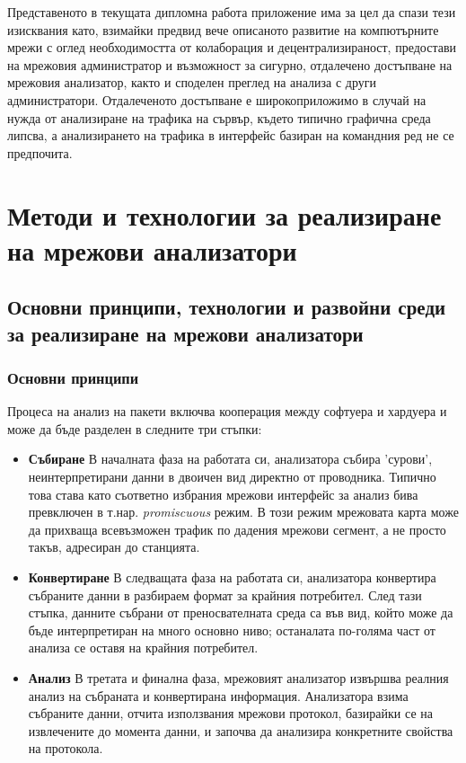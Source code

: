 \documentclass[12pt,a4paper,oneside]{book}
\begin{document}
Представеното в текущата дипломна работа приложение има за цел да спази тези
изисквания като, взимайки предвид вече описаното развитие на компютърните мрежи
с оглед необходимостта от колаборация и децентрализираност, предостави на
мрежовия администратор и възможност за сигурно, отдалечено достъпване на мрежовия
анализатор, както и споделен преглед на анализа с други администратори.
Отдалеченото достъпване е широкоприложимо в случай на нужда от анализиране на
трафика на сървър, където типично графична среда липсва, а анализирането на
трафика в интерфейс базиран на командния ред не се предпочита.

\justify
\chapter{Методи и технологии за реализиране на мрежови анализатори}

\section{Основни принципи, технологии и развойни среди за реализиране на мрежови
анализатори}

\subsection{Основни принципи}
Процеса на анализ на пакети включва кооперация между софтуера и хардуера и може
да бъде разделен в следните три стъпки:

\begin{itemize}
  \item
    \textbf{Събиране} В началната фаза на работата си, анализатора събира
    'сурови', неинтерпретирани данни в двоичен вид директно от проводника.
    Типично това става като съответно избрания мрежови интерфейс за анализ
    бива превключен в т.нар.  \textit{promiscuous} режим. В този режим мрежовата
    карта може да прихваща всевъзможен трафик по дадения мрежови сегмент, а не
    просто такъв, адресиран до станцията.
  \item
    \textbf{Конвертиране} В следващата фаза на работата си, анализатора
    конвертира събраните данни в разбираем формат за крайния потребител. След тази
    стъпка, данните събрани от преносвателната среда са във вид, който може да
    бъде интерпретиран на много основно ниво; останалата по-голяма част от
    анализа се оставя на крайния потребител.
  \item
    \textbf{Анализ} В третата и финална фаза, мрежовият анализатор извършва
    реалния анализ на събраната и конвертирана информация. Анализатора взима
    събраните данни, отчита използвания мрежови протокол, базирайки се на
    извлечените до момента данни, и започва да анализира конкретните свойства на
    протокола.
\end{itemize}
\end{document}
